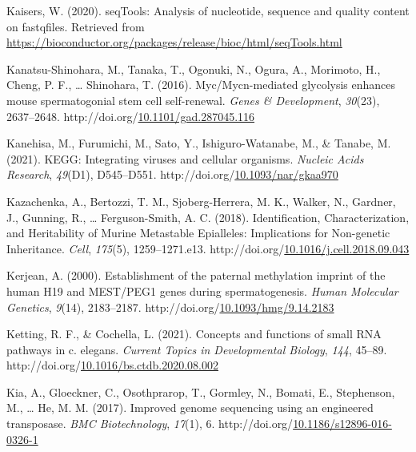 \documentclass[12pt,twoside]{reedthesis}
\newlength{\cslhangindent}
\newenvironment{CSLReferences}[2] %
 {%
  \setlength{\parindent}{0pt}
  \ifodd #1 \everypar{\setlength{\hangindent}{\cslhangindent}}\ignorespaces\fi
  \ifnum #2 > 0
  \setlength{\parskip}{#2\baselineskip}
  \fi
 }%
 {}
\begin{document}
\begin{CSLReferences}{1}{0}
\leavevmode{}%
Kaisers, W. (2020). seqTools: Analysis of nucleotide, sequence and quality content on fastqfiles. Retrieved from \url{https://bioconductor.org/packages/release/bioc/html/seqTools.html}

\leavevmode{}%
Kanatsu-Shinohara, M., Tanaka, T., Ogonuki, N., Ogura, A., Morimoto, H., Cheng, P. F., \ldots{} Shinohara, T. (2016). Myc/Mycn-mediated glycolysis enhances mouse spermatogonial stem cell self-renewal. \emph{Genes \& Development}, \emph{30}(23), 2637--2648. http://doi.org/\href{https://doi.org/10.1101/gad.287045.116}{10.1101/gad.287045.116}

\leavevmode{}%
Kanehisa, M., Furumichi, M., Sato, Y., Ishiguro-Watanabe, M., \& Tanabe, M. (2021). KEGG: Integrating viruses and cellular organisms. \emph{Nucleic Acids Research}, \emph{49}(D1), D545--D551. http://doi.org/\href{https://doi.org/10.1093/nar/gkaa970}{10.1093/nar/gkaa970}

\leavevmode{}%
Kazachenka, A., Bertozzi, T. M., Sjoberg-Herrera, M. K., Walker, N., Gardner, J., Gunning, R., \ldots{} Ferguson-Smith, A. C. (2018). Identification, Characterization, and Heritability of Murine Metastable Epialleles: Implications for Non-genetic Inheritance. \emph{Cell}, \emph{175}(5), 1259--1271.e13. http://doi.org/\href{https://doi.org/10.1016/j.cell.2018.09.043}{10.1016/j.cell.2018.09.043}

\leavevmode{}%
Kerjean, A. (2000). Establishment of the paternal methylation imprint of the human H19 and MEST/PEG1 genes during spermatogenesis. \emph{Human Molecular Genetics}, \emph{9}(14), 2183--2187. http://doi.org/\href{https://doi.org/10.1093/hmg/9.14.2183}{10.1093/hmg/9.14.2183}

\leavevmode{}%
Ketting, R. F., \& Cochella, L. (2021). Concepts and functions of small RNA pathways in c. elegans. \emph{Current Topics in Developmental Biology}, \emph{144}, 45--89. http://doi.org/\href{https://doi.org/10.1016/bs.ctdb.2020.08.002}{10.1016/bs.ctdb.2020.08.002}

\leavevmode{}%
Kia, A., Gloeckner, C., Osothprarop, T., Gormley, N., Bomati, E., Stephenson, M., \ldots{} He, M. M. (2017). Improved genome sequencing using an engineered transposase. \emph{BMC Biotechnology}, \emph{17}(1), 6. http://doi.org/\href{https://doi.org/10.1186/s12896-016-0326-1}{10.1186/s12896-016-0326-1}


\end{CSLReferences}
\end{document}
